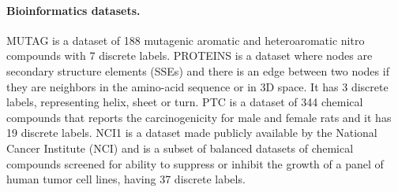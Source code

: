 \begin{appendix}
\paragraph{Bioinformatics datasets.}
MUTAG is a dataset of 188 mutagenic aromatic and heteroaromatic nitro compounds with 7 discrete labels. 
PROTEINS is a dataset where nodes are secondary structure elements (SSEs) and there is an edge between two nodes if they are neighbors in the amino-acid sequence or in 3D space. It has 3 discrete labels, representing helix, sheet or turn.
PTC is a dataset of 344 chemical compounds that reports the carcinogenicity for male and female rats and it has 19 discrete labels.
NCI1 is a dataset made publicly available by the National Cancer Institute (NCI) and is a subset of balanced datasets of chemical compounds screened for ability to suppress or inhibit the growth of a panel of human tumor cell lines, having 37 discrete labels.



\end{appendix}

